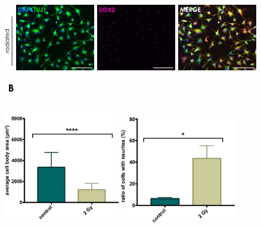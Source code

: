 \documentclass[onecolumn,10pt]{asme2ej}
\begin{document}
\begin{figure}[h]
	\includegraphics[width=0.033\textwidth]{figures/IF/diff+rad/labIR}	
	\includegraphics[width=0.31\textwidth]{figures/IF/diff+rad(light)/ir-t}
	\includegraphics[width=0.31\textwidth]{figures/IF/diff+rad(light)/ir-s}
	\includegraphics[width=0.31\textwidth]{figures/IF/diff+rad(light)/ir-m}
	
	\includegraphics[width=0.05\textwidth]{figures/b}	


	\includegraphics[width=0.45\textwidth]{figures/r_size}
	\includegraphics[width=0.45\textwidth]{figures/r_neurites}
	

\end{figure}
\end{document}
